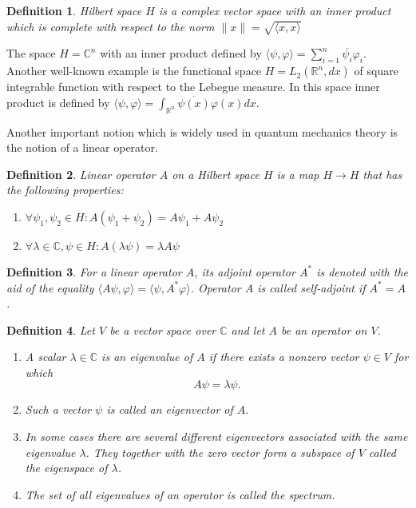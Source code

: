 \documentclass[11pt]{article}
\newtheorem{definition}{Definition}[section]
\begin{document}
\begin{definition}
Hilbert space $H$ is a complex vector space with an inner product which is complete with respect to the norm $\|x\| = \sqrt{\langle x, x\rangle}$
\end{definition}

The space $H = \mathbb{C}^n$ with an inner product defined by $\langle\psi, \varphi \rangle = \sum_{i = 1}^n \overline{\psi_i}\varphi_i$. Another well-known example is the functional space $H = L_2(\mathbb{R}^n, dx)$ of square integrable function with respect to the Lebegue measure. In this space inner product is defined by $\langle\psi, \varphi \rangle = \int_{\mathbb{R}^n}\overline{\psi(x)}\varphi(x) dx$.

Another important notion which is widely used in quantum mechanics theory is the notion of a linear operator.
\begin{definition}
Linear operator $A$ on a Hilbert space $H$ is a map $H \to H$ that has the following properties:
\begin{enumerate}
\item $\forall \psi_1,\psi_2\in H: A(\psi_1 + \psi_2) = A\psi_1 + A\psi_2 $
\item $\forall\lambda\in\mathbb{C}, \psi\in H: A(\lambda\psi) = \lambda A\psi$
\end{enumerate}
\end{definition}

\begin{definition}
For a linear operator $A$, its adjoint operator $A^*$ is denoted with the aid of the equality $\langle A\psi,\varphi\rangle = \langle\psi, A^*\varphi\rangle$. Operator $A$ is called self-adjoint if $A^* = A$.
\end{definition}

\begin{definition}
Let $V$ be a vector space over $\mathbb{C}$ and let $A$ be an operator on $V$.
\begin{enumerate}
\item A scalar $\lambda\in \mathbb{C}$ is an eigenvalue of $A$ if there exists a nonzero vector $\psi\in V$ for which
\[
A\psi = \lambda\psi.
\]
\item Such a vector $\psi$ is called an eigenvector of $A$.
\item In some cases there are several different eigenvectors associated with the same eigenvalue $\lambda$. They together with the zero vector form a subspace of $V$ called the eigenspace of $\lambda$.
\item The set of all eigenvalues of an operator is called the spectrum.
\end{enumerate}
\end{definition}
\end{document}
